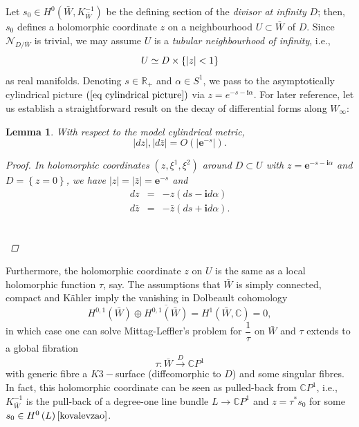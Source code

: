 \documentclass{article}
\newcommand{\e}[1]{\mathbf{e}^{#1}}
\newtheorem{lemma}[theorem]{Lemma}
\begin{document}
Let $s_{0}\in H^{0}\left( \bar{W},K_{\bar{W}}^{-1}\right) $ be the defining
section of the \emph{divisor at infinity} $D$; then, $s_{0}$ defines a holomorphic coordinate $z$ on a
neighbourhood $U\subset\bar{W} $ of $D$. Since $%
\mathcal{N}_{D/\bar{W}}$ is trivial, we may assume $U$ is a \emph{tubular
neighbourhood of infinity}, i.e.,%
\begin{equation}        \index{infinity!neighbourhood of}
                        \label{eq neighbourhood of infinity}
        U\simeq D\times \left\{ \left\vert z\right\vert <1\right\}
\end{equation}%
as real manifolds. Denoting $s\in \mathbb{R}_{+}$ and $\alpha \in S^{1}$, we pass to the asymptotically cylindrical picture $\left( \ref{eq cylindrical
picture}\right) $ via $z=e^{-s-\mathbf{i}\alpha }$. For later reference,
let us establish a straightforward result on the decay of differential forms along $W_\infty$:
\begin{lemma}   \label{lemma decay of coordinates dz dz bar}
With respect to the model cylindrical metric, 
\begin{equation*}
        \left\vert dz\right\vert ,\left\vert d\bar{z}\right\vert 
        =O\left( \left\vert \e{-s}\right\vert \right) .
\end{equation*}
\begin{proof}
In holomorphic coordinates $\left( z,\xi ^{1},\xi ^{2}\right) $ around $%
D\subset U$ with $z=\e{-s-\mathbf{i}\alpha }$ and $%
D=\left\{ z=0\right\} $, we have $\left\vert z\right\vert =\left\vert \bar{z}\right\vert =\e{-s}$ and%
\begin{eqnarray*}
        dz &=&-z\left( ds-\mathbf{i}d\alpha \right) \\
        d\bar{z} &=&-\bar{z}\left( ds+\mathbf{i}d\alpha \right).
\end{eqnarray*}%
\vspace{-1.3cm}\[\qedhere\]
\end{proof}
\end{lemma}

Furthermore, the holomorphic coordinate $z$ on $U$ is the same as a local
holomorphic function $\tau $, say. The assumptions that $\bar{W}$ is simply connected, compact and K\"ahler imply the vanishing in Dolbeault cohomology \cite[Corollary 3.2.12, p.129]{Huybrechts} \begin{displaymath}
        H^{0,1}\left( \bar{W}\right)\oplus \overline{H^{0,1}\left( \bar{W}\right)}
        =H^1(\bar{W},\mathbb{C})=0,
\end{displaymath} 
in which case one can solve Mittag-Leffler's problem for $\dfrac{1}{\tau }$ on $\bar{W}$ \cite[pp.34-35]{Griffiths & Harris} and $\tau$ extends to
a global fibration%
\begin{equation}        \label{eq fibration tau}
        \tau :\bar{W}\overset{D}{\longrightarrow }\mathbb{C}P^{1}
\end{equation}%
with generic fibre a  $K3-$surface (diffeomorphic  to $D$) and some singular fibres. In fact, this
holomorphic coordinate can be seen as pulled-back from $\mathbb{C}P^{1}$, i.e.,  $K_{\bar{W}}^{-1}$ is the pull-back of a
degree-one line bundle $L\rightarrow \mathbb{C}P^{1}$ and $z=\tau ^{\ast
}s_{0}$ for some $s_{0}\in H^{0}\left( L\right) \cite[\S 3]{kovalevzao}$.
\end{document}
